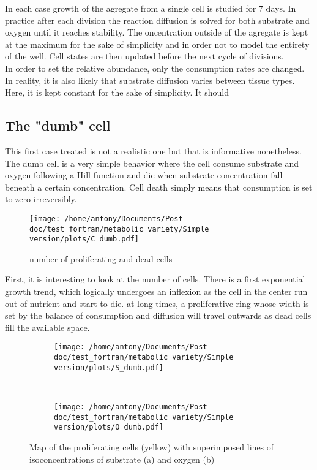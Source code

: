 \documentclass[11pt,a4paper]{article}
\begin{document}
In each case growth of the agregate from a single cell is studied for 7 days. In practice after each division the reaction diffusion is solved for both substrate and oxygen until it reaches stability. The oncentration outside of the agregate is kept at the maximum for the sake of simplicity and in order not to model the entirety of the well. Cell states are then updated before the next cycle of divisions.\\

In order to set the relative abundance, only the consumption rates are changed. In reality, it is also likely that substrate diffusion varies between tissue types. Here, it is kept constant for the sake of simplicity. It should \\

\subsection{The "dumb" cell}
This first case treated is not a realistic one but that is informative nonetheless. The dumb cell is a very simple behavior where the cell consume substrate and oxygen following a Hill function and die when substrate concentration fall beneath a certain concentration. Cell death simply means that consumption is set to zero irreversibly.\\

\begin{figure}[ht!]
	\centering
	\texttt{[image: /home/antony/Documents/Post-doc/test\_fortran/metabolic variety/Simple version/plots/C\_dumb.pdf]}
	\caption{number of proliferating and dead cells \label{C_dumb}}
\end{figure}

First, it is interesting to look at the number of cells. There is a first exponential growth trend, which logically undergoes an inflexion as the cell in the center run out of nutrient and start to die. at long times, a proliferative ring whose width is set by the balance of consumption and diffusion will travel outwards as dead cells fill the available space.\\

\begin{figure}[ht!]
	\begin{subfigure}{0.45\textwidth}
	\centering
	\texttt{[image: /home/antony/Documents/Post-doc/test\_fortran/metabolic variety/Simple version/plots/S\_dumb.pdf]}
	\caption{ \label{S_dumb}}
	\end{subfigure}
	~~
	\begin{subfigure}{0.45\textwidth}
	\texttt{[image: /home/antony/Documents/Post-doc/test\_fortran/metabolic variety/Simple version/plots/O\_dumb.pdf]}
		\caption{ \label{O_dumb}}
	\end{subfigure}
	\caption{Map of the proliferating cells (yellow) with superimposed lines of isoconcentrations of substrate (a) and oxygen (b) \label{dumb}}
\end{figure}
\end{document}
